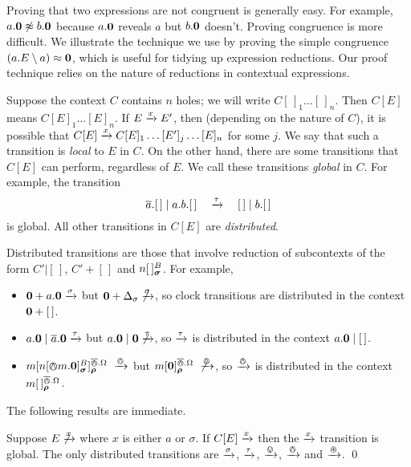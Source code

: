 \documentclass[orivec,envcountsame]{llncs}
\begin{document}
Proving that two expressions are not congruent is generally easy. For
example, $a.\textbf{0} \not\approx b.\textbf{0}$ because $a.\textbf{0}$ reveals $a$
but $b.\textbf{0}$ doesn't. Proving congruence is
more difficult. We illustrate the technique we use by proving the simple
congruence $\left(a. E \setminus {a}\right) \approx \textbf{0}$, which is useful
for tidying up expression reductions. Our proof technique relies on the
nature of reductions in contextual expressions.

Suppose the context $C$ contains $n$ holes; we will write
$C[\,]_1\dots[\,]_n$. Then $C[E]$ means $C[E]_1\dots[E]_n$. If
$E \xrightarrow{x} E'$, then (depending on the nature of $C$), it is possible
that $C[E] \xrightarrow{x} C[E]_1\dots[E']_j\dots[E]_n$ for some $j$.
We say that such a transition is \emph{local} to $E$ in $C$. On the other
hand, there are some transitions that $C[E]$ can perform, regardless of
$E$. We call these transitions \emph{global} in $C$. For example, the
transition \[ \overline{a}.[\,] \mid a . b . [\,] \quad\xrightarrow{\tau}\quad [\,]
\mid b . [\,] \] is global. All other transitions in $C[E]$ are
\emph{distributed}.

\clearpage
Distributed transitions are those that involve reduction of subcontexts of the
form $C'|[\,]$, $C' + [\,]$ and $\locv{n}{\,}{B}{\vec{\sigma}}$. For example,

\begin{itemize}
\item
    $\textbf{0} + a.\textbf{0} \xrightarrow{\sigma}$ but $\textbf{0} + \Delta_\sigma
     \not\xrightarrow{\sigma}$, so clock transitions are distributed in the
     context $\textbf{0} + [\,]$.
\item
    $a.\textbf{0} \mid \overline{a}.\textbf{0} \xrightarrow{\tau}$ but $a.\textbf{0} \mid
     \textbf{0} \not\xrightarrow{\tau}$, so $\xrightarrow{\tau}$ is distributed in the
     context $a.\textbf{0} \mid [\,]$.
\item
    $\locv{m}{ \locv{n}{\tntout{m}.\nil}{B}{\vec{\sigma}}}%
     {\bout.\Omega}{\vec{\rho}} ~\Does{\tout}$ but
    $\locv{m}{ \nil }{\bout.\Omega}{\vec{\rho}} ~\not\Does{\tout}$,
     so $\xrightarrow{\varowedge}$ is distributed in the context $\locv{m}{\,}%
     {\bout.\Omega}{\vec{\rho}}$.
\end{itemize}
The following results are immediate.

\begin{proposition}
Suppose $E \not\xrightarrow{x}$ where $x$ is either $a$ or $\sigma$. If
$C[E] \xrightarrow{x}$ then the $\xrightarrow{x}$ transition is global.
The only distributed transitions are $\xrightarrow{\sigma}$, $\xrightarrow{\tau}$,
$\xrightarrow{\varovee}$, $\xrightarrow{\varowedge}$ and $\xrightarrow{\varoast}$.
\qed \end{proposition}
\end{document}
